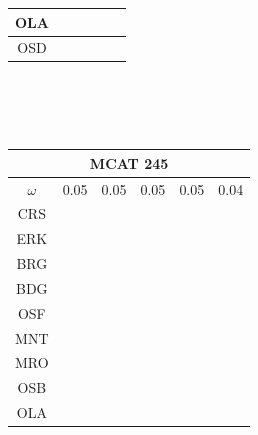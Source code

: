 \documentclass[12pt]{article}
\begin{document}
\begin{landscape}
\begin{figure}
{\begin{minipage}[c]{0.3\textwidth}
\begin{tabular}{|c|c|c|c|c|c|}
        OLA&\cellcolor[HTML]{FF7F00}&\cellcolor[HTML]{984EA3}&\cellcolor[HTML]{984EA3}&\cellcolor[HTML]{984EA3}&\cellcolor[HTML]{FF7F00}\\ \hline %
        OSD&\cellcolor[HTML]{FFFF33}&\cellcolor[HTML]{984EA3}&\cellcolor[HTML]{FF7F00}&\cellcolor[HTML]{984EA3}&\cellcolor[HTML]{FF7F00}\\ \hline %
\end{tabular}\\$~$\\$~$\\
\hspace*{-5cm}
\begin{tabular}{|c|c|c|c|c|c|}
         \hline \multicolumn{6}{|c|}{MCAT 245} \\ \hline
         $\omega$&0.05&0.05&0.05&0.05&0.04 \\ \hline
        CRS&\cellcolor[HTML]{E41A1C}&\cellcolor[HTML]{E41A1C}&\cellcolor[HTML]{E41A1C}&\cellcolor[HTML]{E41A1C}&\cellcolor[HTML]{E41A1C} \\ \hline
        ERK&\cellcolor[HTML]{377EB8}&\cellcolor[HTML]{E41A1C}&\cellcolor[HTML]{E41A1C}&\cellcolor[HTML]{377EB8}&\cellcolor[HTML]{377EB8} \\ \hline
        BRG&\cellcolor[HTML]{4DAF4A}&\cellcolor[HTML]{377EB8}&\cellcolor[HTML]{E41A1C}&\cellcolor[HTML]{377EB8}&\cellcolor[HTML]{377EB8} \\ \hline
        BDG&\cellcolor[HTML]{984EA3}&\cellcolor[HTML]{377EB8}&\cellcolor[HTML]{377EB8}&\cellcolor[HTML]{377EB8}&\cellcolor[HTML]{4DAF4A} \\ \hline
        OSF&\cellcolor[HTML]{984EA3}&\cellcolor[HTML]{377EB8}&\cellcolor[HTML]{4DAF4A}&\cellcolor[HTML]{4DAF4A}&\cellcolor[HTML]{4DAF4A} \\ \hline
        MNT&\cellcolor[HTML]{FF7F00}&\cellcolor[HTML]{4DAF4A}&\cellcolor[HTML]{984EA3}&\cellcolor[HTML]{984EA3}&\cellcolor[HTML]{984EA3} \\ \hline
        MRO&\cellcolor[HTML]{FF7F00}&\cellcolor[HTML]{4DAF4A}&\cellcolor[HTML]{984EA3}&\cellcolor[HTML]{984EA3}&\cellcolor[HTML]{984EA3} \\ \hline
        OSB&\cellcolor[HTML]{FFFF33}&\cellcolor[HTML]{4DAF4A}&\cellcolor[HTML]{FF7F00}&\cellcolor[HTML]{FF7F00}&\cellcolor[HTML]{FF7F00} \\ \hline
        OLA&\cellcolor[HTML]{FFFF33}&\cellcolor[HTML]{984EA3}&\cellcolor[HTML]{FF7F00}&\cellcolor[HTML]{FF7F00}&\cellcolor[HTML]{FF7F00} \\ \hline

\end{tabular}
\end{minipage}}
\end{figure}
\end{landscape}
\end{document}
